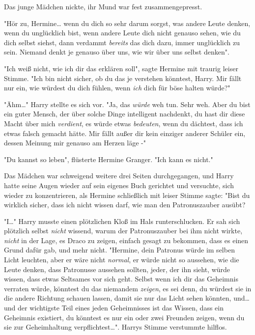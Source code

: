 {Das junge Mädchen nickte, ihr Mund war fest zusammengepresst.

"Hör zu, Hermine… wenn du dich so sehr darum sorgst, was andere Leute denken, wenn du unglücklich bist, wenn andere Leute dich nicht genauso sehen, wie du dich selbst siehst, dann verdammt \emph{bereits} das dich dazu, immer unglücklich zu sein. Niemand denkt je genauso über uns, wie wir über uns selbst denken".

"Ich weiß nicht, wie ich dir das erklären soll", sagte Hermine mit traurig leiser Stimme. "Ich bin nicht sicher, ob du das je verstehen könntest, Harry. Mir fällt nur ein, wie würdest du dich fühlen, wenn \emph{ich} dich für böse halten würde?"

"Ähm…" Harry stellte es sich vor. "Ja, das \emph{würde} weh tun. Sehr weh. Aber du bist ein guter Mensch, der über solche Dinge intelligent nachdenkt, du hast dir diese Macht über mich \emph{verdient}, es würde etwas \emph{bedeuten}, wenn du dächtest, dass ich etwas falsch gemacht hätte. Mir fällt außer dir kein einziger anderer Schüler ein, dessen Meinung mir genauso am Herzen läge -"

"Du kannst so leben", flüsterte Hermine Granger. "Ich kann es nicht."

Das Mädchen war schweigend weitere drei Seiten durchgegangen, und Harry hatte seine Augen wieder auf sein eigenes Buch gerichtet und versuchte, sich wieder zu konzentrieren, als Hermine schließlich mit leiser Stimme sagte: "Bist du wirklich sicher, dass ich nicht wissen darf, wie man den Patronuszauber ausübt?

"I…" Harry musste einen plötzlichen Kloß im Hals runterschlucken. Er sah sich plötzlich selbst \emph{nicht} wissend, warum der Patronuszauber bei ihm nicht wirkte, \emph{nicht} in der Lage, es Draco zu zeigen, einfach gesagt zu bekommen, dass es einen Grund dafür gab, und mehr nicht. "Hermine, dein Patronus würde im selben Licht leuchten, aber er wäre nicht \emph{normal}, er würde nicht so aussehen, wie die Leute denken, dass Patronusse aussehen sollten, jeder, der ihn sieht, würde wissen, dass etwas Seltsames vor sich geht. Selbst wenn ich dir das Geheimnis verraten würde, könntest du das niemandem \emph{zeigen}, es sei denn, du würdest sie in die andere Richtung schauen lassen, damit sie nur das Licht sehen könnten, und… und der wichtigste Teil eines jeden Geheimnisses ist das Wissen, dass ein Geheimnis existiert, du könntest es nur ein oder zwei Freunden zeigen, wenn du sie zur Geheimhaltung verpflichtest…". Harrys Stimme verstummte hilflos.

}
